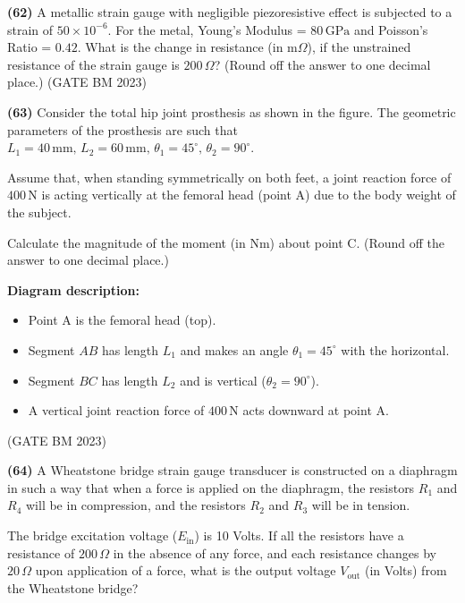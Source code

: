 \documentclass[journal]{IEEEtran}
\numberwithin{equation}{enumi}
\numberwithin{figure}{enumi}
\begin{document}
\textbf{(62)}
A metallic strain gauge with negligible piezoresistive effect is subjected to a strain of \( 50 \times 10^{-6} \). For the metal, Young's Modulus = \( 80 \, \text{GPa} \) and Poisson's Ratio = \( 0.42 \). What is the change in resistance (in m\(\Omega\)), if the unstrained resistance of the strain gauge is \( 200 \, \Omega \)? (Round off the answer to one decimal place.)
\hfill (GATE BM 2023)

\textbf{(63)}
Consider the total hip joint prosthesis as shown in the figure. The geometric parameters of the prosthesis are such that 
\( L_1 = 40 \, \text{mm}, \, L_2 = 60 \, \text{mm}, \, \theta_1 = 45^\circ, \, \theta_2 = 90^\circ \). 

Assume that, when standing symmetrically on both feet, a joint reaction force of \( 400 \, \text{N} \) is acting vertically at the femoral head (point A) due to the body weight of the subject. 

Calculate the magnitude of the moment (in Nm) about point C. (Round off the answer to one decimal place.)

\vspace{1em}
\textbf{Diagram description:}

\begin{itemize}
  \item Point A is the femoral head (top).
  \item Segment \( AB \) has length \( L_1 \) and makes an angle \( \theta_1 = 45^\circ \) with the horizontal.
  \item Segment \( BC \) has length \( L_2 \) and is vertical (\( \theta_2 = 90^\circ \)).
  \item A vertical joint reaction force of \( 400 \, \text{N} \) acts downward at point A.
\end{itemize}
\hfill (GATE BM 2023)

\textbf{(64)}
A Wheatstone bridge strain gauge transducer is constructed on a diaphragm in such a way that when a force is applied on the diaphragm, the resistors \( R_1 \) and \( R_4 \) will be in compression, and the resistors \( R_2 \) and \( R_3 \) will be in tension.

\vspace{1em}
The bridge excitation voltage (\( E_{\text{in}} \)) is 10 Volts. If all the resistors have a resistance of \( 200 \, \Omega \) in the absence of any force, and each resistance changes by \( 20 \, \Omega \) upon application of a force, what is the output voltage \( V_{\text{out}} \) (in Volts) from the Wheatstone bridge? 
\end{document}
